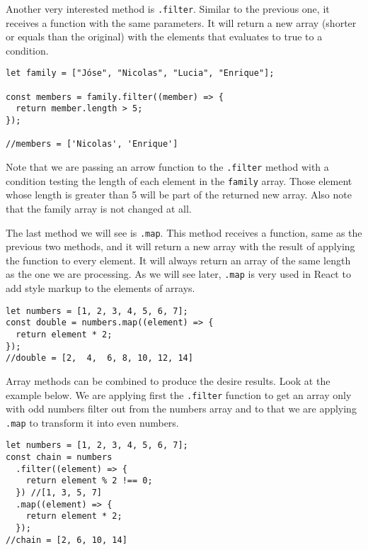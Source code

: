\documentclass[a4paper, oneside, titlepage, 12pt]{book}
\begin{document}
Another very interested method is \texttt{.filter}. Similar to the previous one, it receives a function with the same parameters. It will return a new array (shorter or equals than the original) with the elements that evaluates to true to a condition.

\begin{verbatim}
let family = ["Jóse", "Nicolas", "Lucia", "Enrique"];

const members = family.filter((member) => {
  return member.length > 5;
});

//members = ['Nicolas', 'Enrique']
\end{verbatim}

Note that we are passing an arrow function to the \texttt{.filter} method with a condition testing the length of each element in the \texttt{family} array. Those element whose length is greater than 5 will be part of the returned new array. Also note that the family array is not changed at all.

The last method we will see is \texttt{.map}. This method receives a function, same as the previous two methods, and it will return a new array with the result of applying the function to every element. It will always return an array of the same length as the one we are processing. As we will see later, \texttt{.map} is very used in React to add style markup to the elements of arrays.

\begin{verbatim}
let numbers = [1, 2, 3, 4, 5, 6, 7];
const double = numbers.map((element) => {
  return element * 2;
});
//double = [2,  4,  6, 8, 10, 12, 14]
\end{verbatim}

Array methods can be combined to produce the desire results. Look at the example below. We are applying first the \texttt{.filter} function to get an array only with odd numbers filter out from the numbers array and to that we are applying \texttt{.map} to transform it into even numbers.

\begin{verbatim}
let numbers = [1, 2, 3, 4, 5, 6, 7];
const chain = numbers
  .filter((element) => {
    return element % 2 !== 0;
  }) //[1, 3, 5, 7]
  .map((element) => {
    return element * 2;
  });
//chain = [2, 6, 10, 14]
\end{verbatim}
\end{document}
